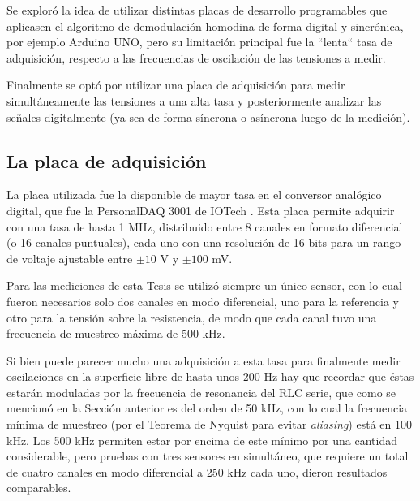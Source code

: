 
Se exploró la idea de utilizar distintas placas de desarrollo programables que aplicasen el algoritmo de demodulación homodina de forma digital y sincrónica, por ejemplo Arduino UNO, pero su limitación principal fue la ``lenta`` tasa de adquisición, respecto a las frecuencias de oscilación de las tensiones a medir.   

Finalmente se optó por utilizar una placa de adquisición para medir simultáneamente las tensiones a una alta tasa y posteriormente analizar las señales digitalmente (ya sea de forma síncrona o asíncrona luego de la medición). 



\subsection{La placa de adquisición}

La placa utilizada fue la disponible de mayor tasa en el conversor analógico digital, que fue la PersonalDAQ 3001 de IOTech \cite{MCC_PersonalDAQ3000_Manual}. Esta placa permite adquirir con una tasa de hasta 1 MHz, distribuido entre 8 canales en formato diferencial (o 16 canales puntuales), cada uno con una resolución de 16 bits para un rango de voltaje ajustable entre $\pm10$ V y $\pm 100$ mV. %

Para las mediciones de esta Tesis se utilizó siempre un único sensor, con lo cual fueron necesarios solo dos canales en modo diferencial, uno para la referencia y otro para la tensión sobre la resistencia, de modo que cada canal tuvo una frecuencia de muestreo máxima de 500 kHz. 

Si bien puede parecer mucho una adquisición a esta tasa para finalmente medir oscilaciones en la superficie libre de hasta unos 200 Hz hay que recordar que éstas estarán moduladas por la frecuencia de resonancia del RLC serie, que como se mencionó en la Sección anterior es del orden de 50 kHz, con lo cual la frecuencia mínima de muestreo (por el Teorema de Nyquist para evitar \textit{aliasing}) está en 100 kHz. Los 500 kHz permiten estar por encima de este mínimo por una cantidad considerable, pero pruebas con tres sensores en simultáneo, que requiere un total de cuatro canales en modo diferencial a 250 kHz cada uno, dieron resultados comparables.  %



